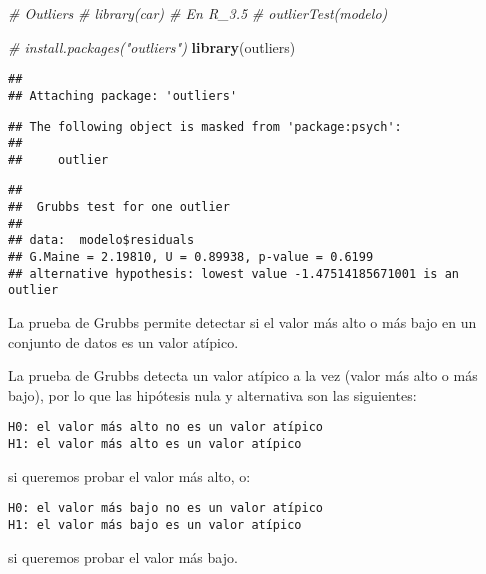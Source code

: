 \documentclass[]{article}
\newenvironment{Shaded}{\begin{snugshade}}{\end{snugshade}}
\newcommand{\KeywordTok}[1]{\textcolor[rgb]{0.13,0.29,0.53}{\textbf{#1}}}
\newcommand{\StringTok}[1]{\textcolor[rgb]{0.31,0.60,0.02}{#1}}
\newcommand{\CommentTok}[1]{\textcolor[rgb]{0.56,0.35,0.01}{\textit{#1}}}
\newcommand{\OperatorTok}[1]{\textcolor[rgb]{0.81,0.36,0.00}{\textbf{#1}}}
\newcommand{\NormalTok}[1]{#1}
\begin{document}
\begin{Shaded}
\begin{Highlighting}[]
\CommentTok{# Outliers}
\CommentTok{# library(car) # En R_3.5}
\CommentTok{# outlierTest(modelo)}

\CommentTok{# install.packages("outliers")}
\KeywordTok{library}\NormalTok{(outliers)}
\end{Highlighting}
\end{Shaded}

\begin{verbatim}
## 
## Attaching package: 'outliers'
\end{verbatim}

\begin{verbatim}
## The following object is masked from 'package:psych':
## 
##     outlier
\end{verbatim}

\begin{Shaded}
\end{Shaded}

\begin{verbatim}
## 
##  Grubbs test for one outlier
## 
## data:  modelo$residuals
## G.Maine = 2.19810, U = 0.89938, p-value = 0.6199
## alternative hypothesis: lowest value -1.47514185671001 is an outlier
\end{verbatim}

La prueba de Grubbs permite detectar si el valor más alto o más bajo en
un conjunto de datos es un valor atípico.

La prueba de Grubbs detecta un valor atípico a la vez (valor más alto o
más bajo), por lo que las hipótesis nula y alternativa son las
siguientes:

\begin{verbatim}
H0: el valor más alto no es un valor atípico
H1: el valor más alto es un valor atípico
\end{verbatim}

si queremos probar el valor más alto, o:

\begin{verbatim}
H0: el valor más bajo no es un valor atípico
H1: el valor más bajo es un valor atípico  
\end{verbatim}

si queremos probar el valor más bajo.
\end{document}
